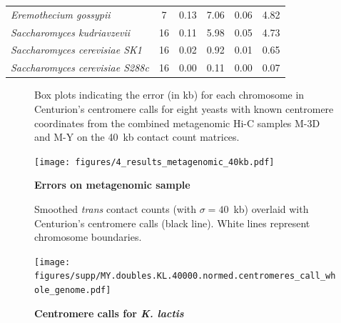 \begin{table}[ht!]
\begin{center}
\begin{tabular}{l | c | r | r | r | r}
\footnotesize{\textit{Eremothecium gossypii}} & \footnotesize{7} & 0.13 & 7.06 & 0.06 & 4.82 \\
\footnotesize{\textit{Saccharomyces kudriavzevii}} & \footnotesize{16} & 0.11 & 5.98 & 0.05 & 4.73 \\
\footnotesize{\textit{Saccharomyces cerevisiae SK1}} & \footnotesize{16} & 0.02 & 0.92 & 0.01 & 0.65 \\
\footnotesize{\textit{Saccharomyces cerevisiae S288c}} & \footnotesize{16} & 0.00 & 0.11 & 0.00 & 0.07 \\
\end{tabular}
\end{center}
\label{supptable:my_qc}
\end{table}

\clearpage

\begin{figure}[ht!]
\caption{\textbf{Errors on metagenomic sample}}{
Box plots indicating the error (in kb) for each chromosome in
Centurion's centromere calls for eight yeasts with known centromere
coordinates from the combined metagenomic Hi-C samples M-3D and M-Y
on the 40~kb contact count matrices.
}
\begin{center}
\texttt{[image: figures/4\_results\_metagenomic\_40kb.pdf]}
\end{center}
\label{suppfig:metagenomic_sample_40}
\end{figure}



\clearpage

\begin{figure}[ht!]
\caption{\textbf{Centromere calls for \textit{K. lactis}}}{
Smoothed \textit{trans} contact counts (with $\sigma=40$~kb) overlaid with
Centurion's centromere calls (black line). White lines represent chromosome
boundaries.
}
\begin{center}
\texttt{[image: figures/supp/MY.doubles.KL.40000.normed.centromeres\_call\_whole\_genome.pdf]}
\end{center}
\label{suppfig:KL_calls}
\end{figure}

